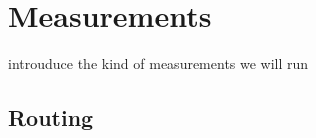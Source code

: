 \documentclass[IN,11pt,twoside,openright,idp,english]{tumthesis}
\begin{document}
\chapter{Measurements}

introuduce the kind of measurements we will run

\section{Routing}





\end{document}
